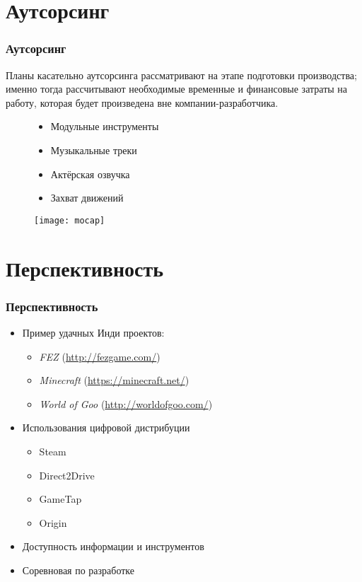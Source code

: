 \section{Аутсорсинг}
\begin{frame}
    \frametitle{Аутсорсинг}
    Планы касательно аутсорсинга рассматривают на этапе подготовки производства; именно тогда 
    рассчитывают необходимые временные и финансовые затраты на работу, которая будет произведена вне 
    компании-разработчика.
    \begin{figure}
        \begin{minipage}{0.47\textwidth}
            \begin{itemize}
                \item Модульные инструменты
                \item Музыкальные треки
                \item Актёрская озвучка
                \item Захват движений
            \end{itemize}
        \end{minipage}
        \begin{minipage}{0.5\textwidth}
            \texttt{[image: mocap]}
        \end{minipage}
    \end{figure}
\end{frame}

\section{Перспективность}
\begin{frame}
    \frametitle{Перспективность}
    \begin{itemize}
        \item Пример удачных Инди проектов:
        \begin{itemize}
            \item \emph{FEZ} (\url{http://fezgame.com/})
            \item \emph{Minecraft} (\url{https://minecraft.net/})
            \item \emph{World of Goo} (\url{http://worldofgoo.com/})
        \end{itemize}
        \item Использования цифровой дистрибуции
        \begin{itemize}
            \item Steam
            \item Direct2Drive
            \item GameTap
            \item Origin
        \end{itemize}
        \item Доступность информации и инструментов
        \item Соревновая по разработке
    \end{itemize}
\end{frame}

